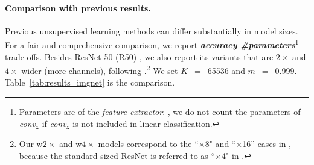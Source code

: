 \documentclass[10pt,twocolumn,letterpaper]{article}
\def\x{\times}
\begin{document}
\begin{table}[t]
\vspace{.1em}
\caption{\textbf{Comparison under the linear classification protocol on ImageNet}. The figure visualizes the table.
All are reported as \mbox{unsupervised} pre-training on the ImageNet-1M training set, followed by supervised linear classification trained on frozen features, evaluated on the validation set.
The parameter counts are those of the feature extractors.
We compare with improved re-implementations if available (referenced after the numbers).
\newline
{\footnotesize
Notations: R101$^*$/R170$^*$ is ResNet-101/170 with the last residual stage removed \cite{Doersch2017,Oord2018,Henaff2019}, and R170 is made wider \cite{Henaff2019}; Rv50 is a reversible net \cite{Gomez2017}, RX50 is ResNeXt-50-32${\x}$8d \cite{Xie2017}.
}
\newline
{\fontsize{7.2pt}{0pt}}
} %
\label{tab:results_imgnet}
\vspace{-1.5em}
\end{table}

\paragraph{Comparison with previous results.}

Previous unsupervised learning methods can differ substantially in model sizes. 
For a fair and comprehensive comparison, we report \textbf{\emph{accuracy} \vs \emph{\#parameters}}\footnote{Parameters are of the \emph{feature extractor}: \eg, we do not count the parameters of \emph{conv}$_\text{x}$ if \emph{conv}$_\text{x}$ is not included in linear classification.}
trade-offs.
Besides \mbox{ResNet-50} (R50) \cite{He2016}, we also report its variants that are ${2}{\x}$ and ${4}{\x}$ wider (more channels), following \cite{Kolesnikov2019}.\footnote{Our w${2}{\x}$ and w${4}{\x}$ models correspond to the ``$\times$8" and ``$\times$16'' cases in \cite{Kolesnikov2019}, because the standard-sized ResNet is referred to as ``$\times$4" in \cite{Kolesnikov2019}.}
We set \mbox{$K$ $=$ 65536} and \mbox{$m$ $=$ 0.999}. Table~\ref{tab:results_imgnet} is the comparison.
\end{document}
